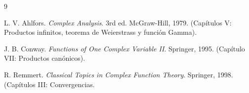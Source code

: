 \documentclass{article}
\theoremstyle{nonumberplain}
\begin{document}
\begin{thebibliography}{9}

L. V. Ahlfors. 
\textit{Complex Analysis}. 
3rd ed. McGraw-Hill, 1979. 
(Capítulos V: Productos infinitos, teorema de Weierstrass y función Gamma).

J. B. Conway. 
\textit{Functions of One Complex Variable II}. 
Springer, 1995. 
(Capítulo VII: Productos canónicos).

R. Remmert. 
\textit{Classical Topics in Complex Function Theory}. 
Springer, 1998. 
(Capítulos III: Convergencias.

\end{thebibliography}
\end{document}
